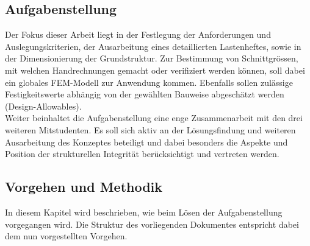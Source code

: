 \subsection{Aufgabenstellung}
\label{Aufgabenstellung}
Der Fokus dieser Arbeit liegt in der Festlegung der Anforderungen und Auslegungskriterien, der Ausarbeitung eines detaillierten Lastenheftes, sowie in der Dimensionierung der Grundstruktur. Zur Bestimmung von Schnittgrössen, mit welchen Handrechnungen gemacht oder verifiziert werden können, soll dabei ein globales FEM-Modell zur Anwendung kommen. Ebenfalls sollen zulässige Festigkeitswerte abhängig von der gewählten Bauweise abgeschätzt werden (Design-Allowables).\\
Weiter beinhaltet die Aufgabenstellung eine enge Zusammenarbeit mit den drei weiteren Mitstudenten. Es soll sich aktiv an der Lösungsfindung und weiteren Ausarbeitung des Konzeptes beteiligt und dabei besonders die Aspekte und Position der strukturellen Integrität berücksichtigt und vertreten werden.

\subsection{Vorgehen und Methodik}
In diesem Kapitel wird beschrieben, wie beim Lösen der Aufgabenstellung vorgegangen wird. Die Struktur des vorliegenden Dokumentes entspricht dabei dem nun vorgestellten Vorgehen.

